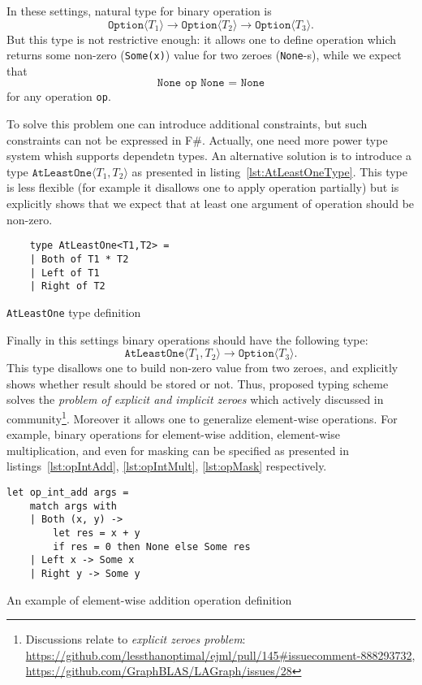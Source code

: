 In these settings, natural type for binary operation is $$\texttt{Option}\langle T_1 \rangle \to \texttt{Option}\langle T_2 \rangle \to \texttt{Option}\langle T_3 \rangle.$$ But this type is not restrictive enough: it allows one to define operation which returns some non-zero (\texttt{Some(x)}) value for two zeroes (\texttt{None}-s), while we expect that $$\texttt{None op None = None}$$ for any operation \texttt{op}.   

To solve this problem one can introduce additional constraints, but such constraints can not be expressed in F\#.
Actually, one need more power type system whish supports dependetn types.
An alternative solution is to introduce a type $\texttt{AtLeastOne} \langle T_1, T_2 \rangle$ as presented in listing~\ref{lst:AtLeastOneType}. This type is less flexible (for example it disallows one to apply operation partially) but is explicitly shows that we expect that at least one argument of operation should be non-zero. 

\begin{listing}[h]
    \begin{verbatim}
    type AtLeastOne<T1,T2> =
    | Both of T1 * T2
    | Left of T1
    | Right of T2
    \end{verbatim}
    \caption{\texttt{AtLeastOne} type definition}
    \label{lst:AtLeastOneType}
\end{listing}

Finally in this settings binary operations should have the following type: $$\texttt{AtLeastOne} \langle T_1, T_2 \rangle \to \texttt{Option}\langle T_3 \rangle.$$
This type disallows one to build non-zero value from two zeroes, and explicitly shows whether result should be stored or not.
Thus, proposed typing scheme solves the \textit{problem of explicit and implicit zeroes} which actively discussed in community\footnote{Discussions relate to \textit{explicit zeroes problem}: \url{https://github.com/lessthanoptimal/ejml/pull/145\#issuecomment-888293732}, \url{https://github.com/GraphBLAS/LAGraph/issues/28}}.
Moreover it allows one to generalize element-wise operations.
For example, binary operations for element-wise addition, element-wise multiplication, and even for masking can be specified as presented in listings~\ref{lst:opIntAdd}, \ref{lst:opIntMult}, \ref{lst:opMask} respectively.

\begin{listing}[h]
    \begin{verbatim}
let op_int_add args =
    match args with
    | Both (x, y) -> 
        let res = x + y 
        if res = 0 then None else Some res 
    | Left x -> Some x
    | Right y -> Some y
    \end{verbatim}
    \caption{An example of element-wise addition operation definition}
    \label{lst:opIntAdd}
\end{listing}

